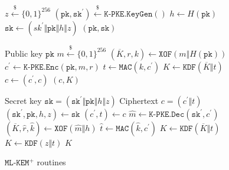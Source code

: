 \documentclass[journal=tches,submission]{iacrtrans}
\newcommand{\keygen}{\texttt{KeyGen}}
\newcommand{\encrypt}{\texttt{Enc}}
\newcommand{\decrypt}{\texttt{Dec}}
\newcommand{\encap}{\texttt{Encap}}
\newcommand{\decap}{\texttt{Decap}}
\newcommand{\mac}{\texttt{MAC}}
\newcommand{\pk}{\texttt{pk}}
\newcommand{\sk}{\texttt{sk}}
\newcommand{\leftsample}{\stackrel{\$}{\leftarrow}}
\begin{document}
\begin{figure}[H]
    \centering

    \begin{minipage}[t]{0.5\textwidth}
        \begin{algorithm}[H]
            \caption*{$\texttt{ML-KEM}^\texttt{+}\texttt{.}\keygen\texttt{()}$}
            \begin{algorithmic}[1]
                \State $z \leftsample \{0,1\}^{256}$
                \State $(\pk, \sk^\prime) \leftsample \texttt{K-PKE}.\keygen()$
                \State $h \leftarrow H(\pk)$
                \State $\sk \leftarrow (sk^\prime \Vert \pk \Vert h \Vert z)$
                \State \Return $(\pk, \sk)$
            \end{algorithmic}
        \end{algorithm}\vspace{-0.5cm}
        \begin{algorithm}[H]
            \caption*{$\texttt{ML-KEM}^\texttt{+}\texttt{.}\encap\texttt{(\pk)}$}
            \begin{algorithmic}[1]
                \Require Public key $\pk$
                \State $m \leftsample \{0,1\}^{256}$
                \State $(\overline{K}, r, k) \leftarrow \texttt{XOF}(m \Vert H(\pk))$
                \State $c^\prime \leftarrow \texttt{K-PKE}.\encrypt(\pk, m, r)$
                \State $t \leftarrow \mac(k, c^\prime)$
                \State $K \leftarrow \texttt{KDF}(\overline{K} \Vert t)$
                \State $c \leftarrow (c^\prime, c)$
                \State \Return $(c, K)$
            \end{algorithmic}
        \end{algorithm}
    \end{minipage}\hfill
    \begin{minipage}[t]{0.49\textwidth}
        \begin{algorithm}[H]
            \caption*{$\texttt{ML-KEM}^\texttt{+}\texttt{.}\decap\texttt{(\sk, c)}$}
            \begin{algorithmic}[1]
                \Require Secret key $\sk = (\sk^\prime \Vert \pk \Vert h \Vert z)$
                \Require Ciphertext $c = (c^\prime \Vert t)$
                \State $(\sk^\prime, \pk, h, z) \leftarrow \sk$
                \State $(c^\prime, t) \leftarrow c$
                \State $\hat{m} \leftarrow \texttt{K-PKE}.\decrypt(\sk^\prime, c^\prime)$
                \State $(\overline{K}, \hat{r}, \hat{k}) \leftarrow \texttt{XOF}(\hat{m} \Vert h)$
                \State $\hat{t} \leftarrow \mac(\hat{k}, c^\prime)$
                    \State $K \leftarrow \texttt{KDF}(\overline{K} \Vert t)$
                \Else
                    \State $K \leftarrow \texttt{KDF}(z \Vert t)$
                \EndIf
                \State \Return $K$
            \end{algorithmic}
        \end{algorithm}
    \end{minipage}

    \caption{$\texttt{ML-KEM}^+$ routines}\label{fig:ml-kem-plus-routines}
\end{figure}
\end{document}
